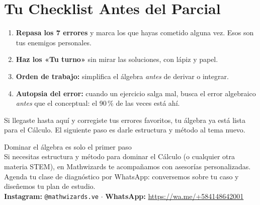 \documentclass[12pt, letterpaper]{article}
\makeatletter
\newcommand{\mwcta}[2]{%
  \begin{center}
    \begin{minipage}{0.94\linewidth}
      \begin{cuadroextra}
        \centering
        {\nxheav\Large\color{mwprimario}#1}\\[8pt]
        {\small #2}\\[12pt]
        {\footnotesize\color{mwgris}
          \textbf{Instagram:} \texttt{@mathwizards.ve} \quad$\cdot$\quad
          \textbf{WhatsApp:} \url{https://wa.me/+584148642001}}
      \end{cuadroextra}
    \end{minipage}
  \end{center}
}
\makeatother
\begin{document}
\section{Tu Checklist Antes del Parcial}

\begin{cuadroinfo}
  \small
  \begin{enumerate}[leftmargin=*]
    \item \textbf{Repasa los 7 errores} y marca los que hayas cometido alguna vez. Esos son tus enemigos personales.
    \item \textbf{Haz los «Tu turno»} sin mirar las soluciones, con lápiz y papel.
    \item \textbf{Orden de trabajo:} simplifica el álgebra \emph{antes} de derivar o integrar.
    \item \textbf{Autopsia del error:} cuando un ejercicio salga mal, busca el error algebraico \emph{antes} que el conceptual: el 90\,\% de las veces está ahí.
  \end{enumerate}
\end{cuadroinfo}

\noindent Si llegaste hasta aquí y corregiste tus errores favoritos, tu álgebra ya está lista para el Cálculo. El siguiente paso es darle estructura y método al tema nuevo.

\newpage
\vspace*{\fill}

\mwcta{Dominar el álgebra es solo el primer paso}{Si necesitas estructura y método para dominar el Cálculo (o cualquier otra materia STEM), en Mathwizards te acompañamos con asesorías personalizadas. Agenda tu clase de diagnóstico por WhatsApp: conversemos sobre tu caso y diseñemos tu plan de estudio.}

\vspace*{\fill}
\end{document}
